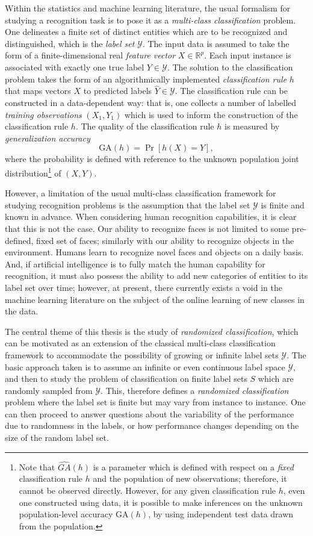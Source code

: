 Within the statistics and machine learning literature, the usual
formalism for studying a recognition task is to pose it as a
\emph{multi-class classification} problem.  One delineates a finite
set of distinct entities which are to be recognized and distinguished,
which is the \emph{label set} $\mathcal{Y}$.  The input data is
assumed to take the form of a finite-dimensional real \emph{feature
  vector} $X \in \mathbb{R}^p$.  Each input instance is associated
with exactly one true label $Y \in \mathcal{Y}$.  The solution to the
classification problem takes the form of an algorithmically
implemented \emph{classification rule} $h$ that maps vectors $X$ to
predicted labels $\hat{Y} \in \mathcal{Y}$.  The classification rule
can be constructed in a data-dependent way: that is, one collects a
number of labelled \emph{training observations} $(X_1, Y_1)$ which is
used to inform the construction of the classification rule $h$.  The
quality of the classification rule $h$ is measured by \emph{generalization accuracy}
\[
\text{GA}(h) = \Pr[h(X) = Y],
\]
where the probability is defined with reference to the unknown
population joint distribution\footnote{Note that
  $\hat{GA}(h)$ is a parameter which is defined with respect on a
  \emph{fixed} classification rule $h$ and the population of new
  observations; therefore, it cannot be observed directly.  However,
  for any given classification rule $h$, even one constructed using
  data, it is possible to make inferences on the unknown
  population-level accuracy $\text{GA}(h)$, by using independent test
  data drawn from the population.}  of $(X, Y)$.

However, a limitation of the usual multi-class classification
framework for studying recognition problems is the assumption that the
label set $\mathcal{Y}$ is finite and known in advance.  When
considering human recognition capabilities, it is clear that this is
not the case.  Our ability to recognize faces is not limited to some
pre-defined, fixed set of faces; similarly with our ability to recognize
objects in the environment.  Humans learn to recognize novel faces and
objects on a daily basis.  And, if artificial intelligence is to fully
match the human capability for recognition, it must also possess the
ability to add new categories of entities to its label set over time;
however, at present, there currently exists a void in the machine
learning literature on the subject of the online learning of new
classes in the data.

The central theme of this thesis is the study of \emph{randomized
  classification}, which can be motivated as an extension of the
classical multi-class classification framework to accommodate the
possibility of growing or infinite label sets $\mathcal{Y}$. The basic
approach taken is to assume an infinite or even continuous label space
$\mathcal{Y}$, and then to study the problem of classification on
finite label sets $S$ which are randomly sampled from $\mathcal{Y}.$
This, therefore defines a \emph{randomized classification} problem
where the label set is finite but may vary from instance to instance.
One can then proceed to answer questions about the variability of the
performance due to randomness in the labels, or how performance
changes depending on the size of the random label set.

